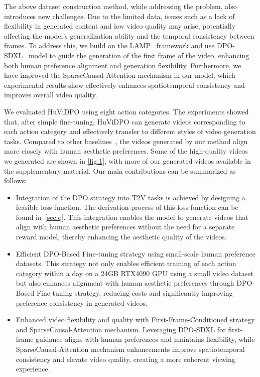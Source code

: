 The above dataset construction method, while addressing the problem, also introduces new challenges. Due to the limited data, issues such as a lack of flexibility in generated content and low video quality may arise, potentially affecting the model's generalization ability and the temporal consistency between frames. To address this, we build on the LAMP~\cite{wu2023lamp} framework and use DPO-SDXL~\cite{wallace2024diffusion} model to guide the generation of the first frame of the video, enhancing both human preference alignment and generation flexibility. Furthermore, we have improved the SparseCausal-Attention mechanism in our model, which experimental results show effectively enhances spatiotemporal consistency and improves overall video quality.

We evaluated HuViDPO using eight action categories. The experiments showed that, after simple fine-tuning, HuViDPO can generate videos corresponding to each action category and effectively transfer to different styles of video generation tasks. Compared to other baselines~\cite{he2022latent,guo2023animatediff,wu2023lamp}, the videos generated by our method align more closely with human aesthetic preferences. Some of the high-quality videos we generated are shown in \cref{fig:1}, with more of our generated videos available in the supplementary material. Our main contributions can be summarized as follows:

\begin{itemize}
\item
Integration of the DPO strategy into T2V tasks is achieved by designing a feasible loss function. The derivation process of this loss function can be found in~\cref{sec:q}. This integration enables the model to generate videos that align with human aesthetic preferences without the need for a separate reward model, thereby enhancing the aesthetic quality of the videos.

\item
Efficient DPO-Based Fine-tuning strategy using small-scale human preference datasets. This strategy not only enables efficient training of each action category within a day on a 24GB RTX4090 GPU using a small video dataset but also enhances alignment with human aesthetic preferences through DPO-Based Fine-tuning strategy, reducing costs and significantly improving preference consistency in generated videos.

\item
Enhanced video flexibility and quality with First-Frame-Conditioned strategy and SparseCausal-Attention mechanism. Leveraging DPO-SDXL for first-frame guidance aligns with human preferences and maintains flexibility, while SparseCausal-Attention mechanism enhancements improve spatiotemporal consistency and elevate video quality, creating a more coherent viewing experience.
\end{itemize}